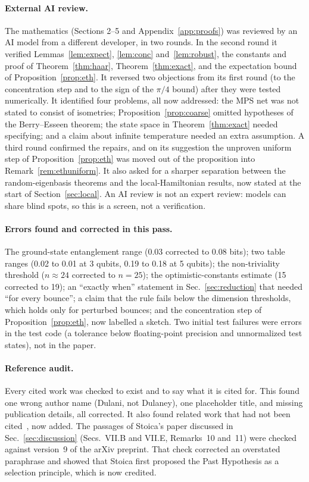 \documentclass[11pt]{article}
\theoremstyle{definition}
\theoremstyle{remark}
\begin{document}
\paragraph{External AI review.} The mathematics (Sections 2--5 and Appendix~\ref{app:proofs}) was reviewed by an AI model from a different developer, in two rounds. In the second round it verified Lemmas~\ref{lem:expect}, \ref{lem:conc} and~\ref{lem:robust}, the constants and proof of Theorem~\ref{thm:haar}, Theorem~\ref{thm:exact}, and the expectation bound of Proposition~\ref{prop:eth}. It reversed two objections from its first round (to the concentration step and to the sign of the $\pi/4$ bound) after they were tested numerically. It identified four problems, all now addressed: the MPS net was not stated to consist of isometries; Proposition~\ref{prop:coarse} omitted hypotheses of the Berry--Esseen theorem; the state space in Theorem~\ref{thm:exact} needed specifying; and a claim about infinite temperature needed an extra assumption. A third round confirmed the repairs, and on its suggestion the unproven uniform step of Proposition~\ref{prop:eth} was moved out of the proposition into Remark~\ref{rem:ethuniform}. It also asked for a sharper separation between the random-eigenbasis theorems and the local-Hamiltonian results, now stated at the start of Section~\ref{sec:local}. An AI review is not an expert review: models can share blind spots, so this is a screen, not a verification.

\paragraph{Errors found and corrected in this pass.} The ground-state entanglement range (0.03 corrected to 0.08 bits); two table ranges (0.02 to 0.01 at 3 qubits, 0.19 to 0.18 at 5 qubits); the non-triviality threshold ($n\approx24$ corrected to $n=25$); the optimistic-constants estimate (15 corrected to 19); an ``exactly when'' statement in Sec.~\ref{sec:reduction} that needed ``for every bounce''; a claim that the rule fails below the dimension thresholds, which holds only for perturbed bounces; and the concentration step of Proposition~\ref{prop:eth}, now labelled a sketch. Two initial test failures were errors in the test code (a tolerance below floating-point precision and unnormalized test states), not in the paper.

\paragraph{Reference audit.} Every cited work was checked to exist and to say what it is cited for. This found one wrong author name (Dulani, not Dulaney), one placeholder title, and missing publication details, all corrected. It also found related work that had not been cited~\cite{ZLL2004,Zanardi2024,Adil2024}, now added. The passages of Stoica's paper discussed in Sec.~\ref{sec:discussion} (Secs.~VII.B and VII.E, Remarks~10 and~11) were checked against version~9 of the arXiv preprint. That check corrected an overstated paraphrase and showed that Stoica first proposed the Past Hypothesis as a selection principle, which is now credited.
\end{document}
